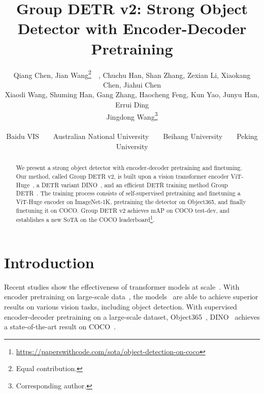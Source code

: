 \documentclass[10pt,twocolumn,letterpaper]{article}
\begin{document}
\title{Group DETR v2: Strong Object Detector with Encoder-Decoder Pretraining}
\author{
Qiang Chen, Jian Wang\thanks{Equal contribution.}~~, Chuchu Han, Shan Zhang, Zexian Li, Xiaokang Chen, Jiahui Chen \\ Xiaodi Wang, Shuming Han, Gang Zhang, Haocheng Feng, Kun Yao, Junyu Han, Errui Ding\\ Jingdong Wang\thanks{Corresponding author.} \\
\\
Baidu VIS~~~~Australian National University~~~~Beihang University~~~~Peking University\\
}

\maketitle

\begin{abstract} 
We present a strong object detector with 
encoder-decoder pretraining and finetuning. 
Our method, called Group DETR v2, is built upon a vision transformer encoder ViT-Huge~\cite{dosovitskiy2020image}, 
a DETR variant DINO~\cite{zhang2022dino}, and an efficient DETR training method 
Group DETR~\cite{chen2022group}. 
The training process consists of self-supervised pretraining and finetuning a ViT-Huge encoder on ImageNet-1K, 
pretraining the detector on Object365, 
and finally finetuning it on COCO. 
Group DETR v2 achieves  mAP on COCO test-dev, and
establishes a new SoTA on the COCO leaderboard\footnote{\url{https://paperswithcode.com/sota/object-detection-on-coco}}.
\end{abstract}


\section{Introduction} \label{sec:intro}

Recent studies show the effectiveness of transformer models at scale~\cite{dosovitskiy2020image,zhai2022scaling,liu2022swin}.
With encoder pretraining on large-scale data~\cite{deng2009imagenet,ridnik2021imagenet}, the models~\cite{bao2021beit,he2022masked,xie2022simmim,chen2022context,peng2022beit,wang2022image} are able to achieve superior results 
on various vision tasks, including object detection. 
With supervised encoder-decoder pretraining on a large-scale dataset, Object365~\cite{shao2019objects365}, DINO~\cite{zhang2022dino} achieves a state-of-the-art result on COCO~\cite{lin2014microsoft}.
\end{document}
